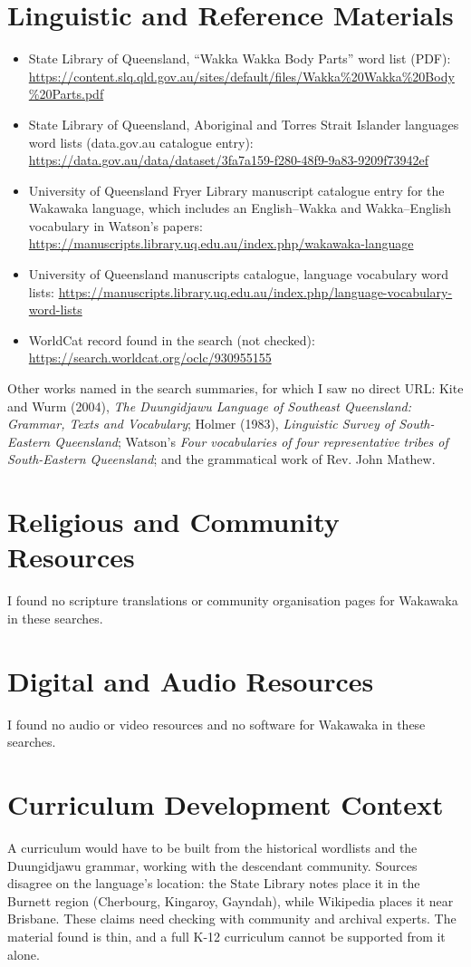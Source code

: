 \documentclass[12pt]{article}
\begin{document}
\section{Linguistic and Reference Materials}
\begin{itemize}
\item State Library of Queensland, ``Wakka Wakka Body Parts'' word list (PDF): \url{https://content.slq.qld.gov.au/sites/default/files/Wakka%20Wakka%20Body%20Parts.pdf}
\item State Library of Queensland, Aboriginal and Torres Strait Islander languages word lists (data.gov.au catalogue entry): \url{https://data.gov.au/data/dataset/3fa7a159-f280-48f9-9a83-9209f73942ef}
\item University of Queensland Fryer Library manuscript catalogue entry for the Wakawaka language, which includes an English--Wakka and Wakka--English vocabulary in Watson's papers: \url{https://manuscripts.library.uq.edu.au/index.php/wakawaka-language}
\item University of Queensland manuscripts catalogue, language vocabulary word lists: \url{https://manuscripts.library.uq.edu.au/index.php/language-vocabulary-word-lists}
\item WorldCat record found in the search (not checked): \url{https://search.worldcat.org/oclc/930955155}
\end{itemize}
Other works named in the search summaries, for which I saw no direct URL: Kite and Wurm (2004), \emph{The Duungidjawu Language of Southeast Queensland: Grammar, Texts and Vocabulary}; Holmer (1983), \emph{Linguistic Survey of South-Eastern Queensland}; Watson's \emph{Four vocabularies of four representative tribes of South-Eastern Queensland}; and the grammatical work of Rev. John Mathew.

\section{Religious and Community Resources}
I found no scripture translations or community organisation pages for Wakawaka in these searches.

\section{Digital and Audio Resources}
I found no audio or video resources and no software for Wakawaka in these searches.

\section{Curriculum Development Context}
A curriculum would have to be built from the historical wordlists and the Duungidjawu grammar, working with the descendant community. Sources disagree on the language's location: the State Library notes place it in the Burnett region (Cherbourg, Kingaroy, Gayndah), while Wikipedia places it near Brisbane. These claims need checking with community and archival experts. The material found is thin, and a full K-12 curriculum cannot be supported from it alone.
\end{document}
